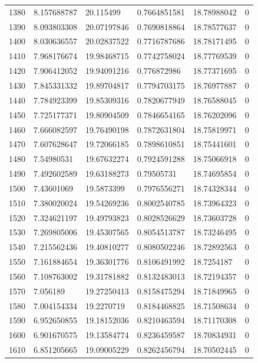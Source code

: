 \begin{longtable}{llllll}
1380 & 8.157688787 & 20.115499 & 0.7664851581 & 18.78988042 & 0 \\
1390 & 8.093803308 & 20.07197846 & 0.7690818864 & 18.78577637 & 0 \\
1400 & 8.030636557 & 20.02837522 & 0.7716787686 & 18.78171495 & 0 \\
1410 & 7.968176674 & 19.98468715 & 0.7742758024 & 18.77769539 & 0 \\
1420 & 7.906412052 & 19.94091216 & 0.776872986 & 18.77371695 & 0 \\
1430 & 7.845331332 & 19.89704817 & 0.7794703175 & 18.76977887 & 0 \\
1440 & 7.784923399 & 19.85309316 & 0.7820677949 & 18.76588045 & 0 \\
1450 & 7.725177371 & 19.80904509 & 0.7846654165 & 18.76202096 & 0 \\
1460 & 7.666082597 & 19.76490198 & 0.7872631804 & 18.75819971 & 0 \\
1470 & 7.607628647 & 19.72066185 & 0.7898610851 & 18.75441601 & 0 \\
1480 & 7.54980531 & 19.67632274 & 0.7924591288 & 18.75066918 & 0 \\
1490 & 7.492602589 & 19.63188273 & 0.79505731 & 18.74695854 & 0 \\
1500 & 7.43601069 & 19.5873399 & 0.7976556271 & 18.74328344 & 0 \\
1510 & 7.380020024 & 19.54269236 & 0.8002540785 & 18.73964323 & 0 \\
1520 & 7.324621197 & 19.49793823 & 0.8028526629 & 18.73603728 & 0 \\
1530 & 7.269805006 & 19.45307565 & 0.8054513787 & 18.73246495 & 0 \\
1540 & 7.215562436 & 19.40810277 & 0.8080502246 & 18.72892563 & 0 \\
1550 & 7.161884654 & 19.36301776 & 0.8106491992 & 18.7254187 & 0 \\
1560 & 7.108763002 & 19.31781882 & 0.8132483013 & 18.72194357 & 0 \\
1570 & 7.056189 & 19.27250413 & 0.8158475294 & 18.71849965 & 0 \\
1580 & 7.004154334 & 19.2270719 & 0.8184468825 & 18.71508634 & 0 \\
1590 & 6.952650855 & 19.18152036 & 0.8210463594 & 18.71170308 & 0 \\
1600 & 6.901670575 & 19.13584774 & 0.8236459587 & 18.70834931 & 0 \\
1610 & 6.851205665 & 19.09005229 & 0.8262456794 & 18.70502445 & 0 \\

\end{longtable}
